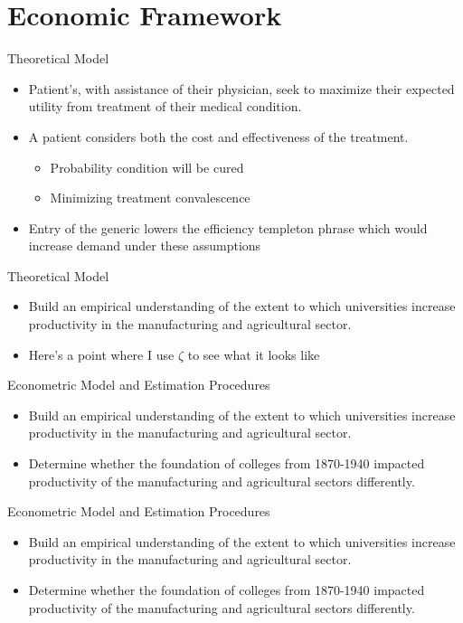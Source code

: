\documentclass{beamer}
\begin{document}
\section{Economic Framework}
\begin{frame}{Theoretical Model}
\begin{itemize}
\item Patient's, with assistance of their physician, seek to maximize their expected utility from treatment of their medical condition.
\item A patient considers both the cost and effectiveness of the treatment.
  \begin{itemize}
    \item Probability condition will be cured
    \item Minimizing treatment convalescence
  \end{itemize}
\item Entry of the generic lowers the efficiency templeton phrase which would increase demand under these assumptions
\end{itemize}
\end{frame}

\begin{frame}{Theoretical Model}
\begin{itemize}
\item Build an empirical understanding of the extent to which  universities increase productivity in the manufacturing and agricultural sector.
\item Here's a point where I use $\zeta$ to see what it looks like
\end{itemize}
\end{frame}


\begin{frame}{Econometric Model and Estimation Procedures}
\begin{itemize}
\item Build an empirical understanding of the extent to which  universities increase productivity in the manufacturing and agricultural sector.
\item Determine whether the foundation of colleges from 1870-1940 impacted productivity of the manufacturing and agricultural sectors differently.
\end{itemize}
\end{frame}


\begin{frame}{Econometric Model and Estimation Procedures}
\begin{itemize}
\item Build an empirical understanding of the extent to which  universities increase productivity in the manufacturing and agricultural sector.
\item Determine whether the foundation of colleges from 1870-1940 impacted productivity of the manufacturing and agricultural sectors differently.
\end{itemize}
\end{frame}
\end{document}
